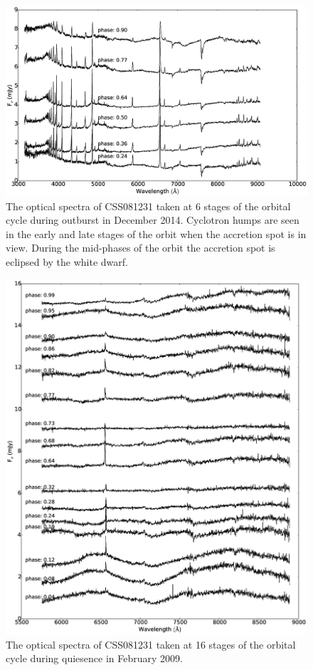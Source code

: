\documentclass[a4paper,fleqn,usenatbib]{mnras}
\begin{document}
\begin{figure}
\centering
\includegraphics[width=\textwidth]{images/CSS081231_spectra.eps}
\caption[Caption for spectra]{The optical spectra of CSS081231 taken at 6 stages of the orbital cycle during outburst in December 2014. Cyclotron humps are seen in the early and late stages of the orbit when the accretion spot is in view. During the mid-phases of the orbit the accretion spot is eclipsed by the white dwarf. }
\label{fig:spectra-outburst}
\end{figure}

\begin{figure}
\centering
\includegraphics[width=\textwidth]{images/CSS081231_spectra_q.eps}
\caption[Caption for spectra]{The optical spectra of CSS081231 taken at 16 stages of the orbital cycle during quiesence in February 2009.  }
\label{fig:spectra-quiescent}
\end{figure}
\end{document}
